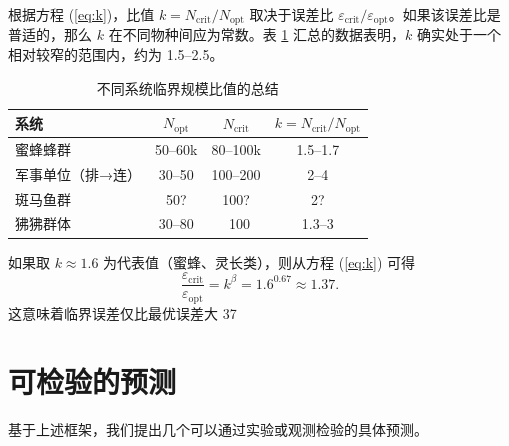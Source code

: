 \documentclass[12pt]{article}
\theoremstyle{remark}
\begin{document}
	根据方程 (\ref{eq:k})，比值 $k = N_{\text{crit}}/N_{\text{opt}}$ 取决于误差比 $\varepsilon_{\text{crit}}/\varepsilon_{\text{opt}}$。如果该误差比是普适的，那么 $k$ 在不同物种间应为常数。表 \ref{tab:summary} 汇总的数据表明，$k$ 确实处于一个相对较窄的范围内，约为 1.5–2.5。
	
	\begin{table}[htbp]
		\centering
		\caption{不同系统临界规模比值的总结}
		\label{tab:summary}
		\begin{tabular}{lccc}
			\toprule
			\textbf{系统} & $N_{\text{opt}}$ & $N_{\text{crit}}$ & $k = N_{\text{crit}}/N_{\text{opt}}$ \\
			\midrule
			蜜蜂蜂群 & 50–60k & 80–100k & 1.5–1.7 \\
			军事单位（排→连） & 30–50 & 100–200 & 2–4 \\
			斑马鱼群 & 50? & 100? & 2? \\
			狒狒群体 & 30–80 & ~100 & 1.3–3 \\
			\bottomrule
		\end{tabular}
	\end{table}
	
	如果取 $k \approx 1.6$ 为代表值（蜜蜂、灵长类），则从方程 (\ref{eq:k}) 可得
	\[
	\frac{\varepsilon_{\text{crit}}}{\varepsilon_{\text{opt}}} = k^{\beta} = 1.6^{0.67} \approx 1.37.
	\]
	这意味着临界误差仅比最优误差大 37%
	
	\section{可检验的预测}
	\label{sec:predictions}
	
	基于上述框架，我们提出几个可以通过实验或观测检验的具体预测。
	
\end{document}
